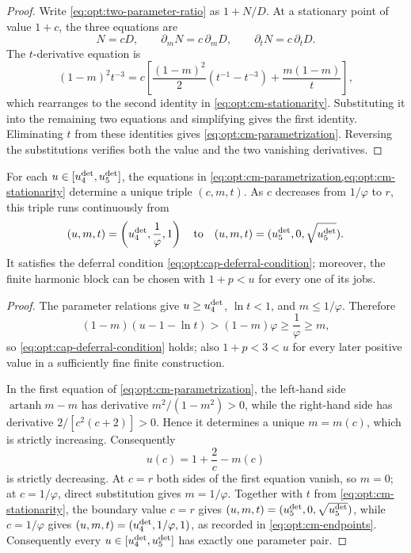 \begin{proof}
Write \cref{eq:opt:two-parameter-ratio} as $1+N/D$.  At a stationary
point of value $1+c$, the three equations are
\[
 N=cD,\qquad \partial_mN=c\,\partial_mD,\qquad
 \partial_tN=c\,\partial_tD.
\]
The $t$-derivative equation is
\[
 (1-m)^2t^{-3}
 =c\left[\frac{(1-m)^2}{2}(t^{-1}-t^{-3})
          +\frac{m(1-m)}t\right],
\]
which rearranges to the second identity in
\cref{eq:opt:cm-stationarity}.  Substituting it into the remaining two
equations and simplifying gives the first identity.  Eliminating $t$ from
these identities gives \cref{eq:opt:cm-parametrization}.  Reversing the
substitutions verifies both the value and the two vanishing derivatives.
\end{proof}

\begin{claim}
\label{clm:opt:cm-feasibility}
For each $u\in[u_{4}^{\mathrm{det}},u_{5}^{\mathrm{det}}]$, the equations in
\cref{eq:opt:cm-parametrization,eq:opt:cm-stationarity} determine a unique
triple $(c,m,t)$.  As $c$ decreases from $1/\varphi$ to $r$, this triple runs
continuously from
\begin{equation}
 (u,m,t)=\left(u_{4}^{\mathrm{det}},\frac1\varphi,1\right)
 \quad\text{to}\quad
 (u,m,t)=(u_{5}^{\mathrm{det}},0,\sqrt{u_{5}^{\mathrm{det}}}).
 \label{eq:opt:cm-endpoints}
\end{equation}
It satisfies the deferral condition
\cref{eq:opt:cap-deferral-condition}; moreover, the finite harmonic block can
be chosen with $1+p<u$ for every one of its jobs.
\end{claim}

\begin{proof}
The parameter relations give $u\ge u_{4}^{\mathrm{det}}$, $\ln t<1$, and
$m\le1/\varphi$.  Therefore
\begin{equation}
 (1-m)(u-1-\ln t)
 >(1-m)\varphi\ge\frac1\varphi\ge m,
\end{equation}
so \cref{eq:opt:cap-deferral-condition} holds; also $1+p<3<u$ for every
later positive value in a sufficiently fine finite construction.

In the first equation of \cref{eq:opt:cm-parametrization}, the left-hand
side $\operatorname{artanh}m-m$ has derivative
$m^2/(1-m^2)>0$, while the right-hand side has derivative
$2/[c^2(c+2)]>0$.  Hence it determines a unique $m=m(c)$, which is strictly
increasing.  Consequently
\begin{equation}
 u(c)=1+\frac2c-m(c)
\end{equation}
is strictly decreasing.  At $c=r$ both sides of the first equation vanish,
so $m=0$; at $c=1/\varphi$, direct substitution gives $m=1/\varphi$.
Together with $t$ from \cref{eq:opt:cm-stationarity}, the boundary value
$c=r$ gives $(u,m,t)=(u_{5}^{\mathrm{det}},0,\sqrt{u_{5}^{\mathrm{det}}})$, while
$c=1/\varphi$ gives
$(u,m,t)=(u_{4}^{\mathrm{det}},1/\varphi,1)$, as recorded in
\cref{eq:opt:cm-endpoints}.
Consequently every
$u\in[u_{4}^{\mathrm{det}},u_{5}^{\mathrm{det}}]$ has exactly one parameter pair.
\end{proof}

